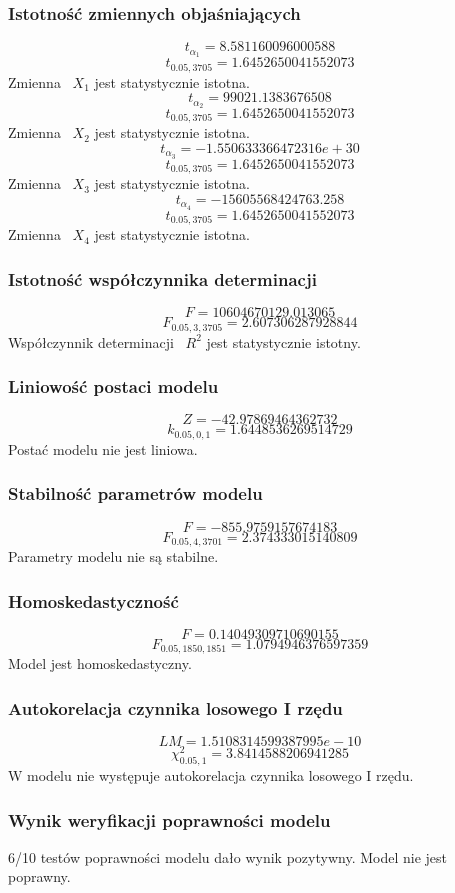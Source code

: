 \documentclass{article}
\begin{document}
\subsubsection{Istotność zmiennych objaśniających}
\[t_{\alpha_{1}} = 8.581160096000588\]
\[t_{0.05, 3705} = 1.6452650041552073\]
Zmienna ~$X_{1}$ jest statystycznie istotna.
\[t_{\alpha_{2}} = 99021.1383676508\]
\[t_{0.05, 3705} = 1.6452650041552073\]
Zmienna ~$X_{2}$ jest statystycznie istotna.
\[t_{\alpha_{3}} = -1.550633366472316e+30\]
\[t_{0.05, 3705} = 1.6452650041552073\]
Zmienna ~$X_{3}$ jest statystycznie istotna.
\[t_{\alpha_{4}} = -15605568424763.258\]
\[t_{0.05, 3705} = 1.6452650041552073\]
Zmienna ~$X_{4}$ jest statystycznie istotna.
\subsubsection{Istotność współczynnika determinacji}
\[F = 10604670129.013065\]
\[F_{0.05, 3, 3705} = 2.607306287928844\]
Współczynnik determinacji ~$R^2$ jest statystycznie istotny.
\subsubsection{Liniowość postaci modelu}
\[Z = -42.97869464362732\]
\[k_{0.05, 0, 1} = 1.6448536269514729\]
Postać modelu nie jest liniowa.
\subsubsection{Stabilność parametrów modelu}
\[F = -855.9759157674183\]
\[F_{0.05, 4, 3701} = 2.374333015140809\]
Parametry modelu nie są stabilne.
\subsubsection{Homoskedastyczność}
\[F = 0.14049309710690155\]
\[F_{0.05, 1850, 1851} = 1.0794946376597359\]
Model jest homoskedastyczny.
\subsubsection{Autokorelacja czynnika losowego I rzędu}
\[LM = 1.5108314599387995e-10\]
\[\chi^2_{0.05, 1} = 3.8414588206941285\]
W modelu nie występuje autokorelacja czynnika losowego I rzędu.
\subsubsection{Wynik weryfikacji poprawności modelu}
6/10 testów poprawności modelu dało wynik pozytywny. Model nie jest poprawny.
\end{document}
